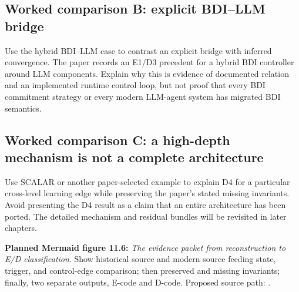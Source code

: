 \subsection{Worked comparison B: explicit BDI--LLM bridge}
Use the hybrid BDI--LLM case to contrast an explicit bridge with inferred convergence. The paper records an E1/D3 precedent for a hybrid BDI controller around LLM components. Explain why this is evidence of documented relation and an implemented runtime control loop, but not proof that every BDI commitment strategy or every modern LLM-agent system has migrated BDI semantics.

\subsection{Worked comparison C: a high-depth mechanism is not a complete architecture}
Use SCALAR or another paper-selected example to explain D4 for a particular cross-level learning edge while preserving the paper's stated missing invariants. Avoid presenting the D4 result as a claim that an entire architecture has been ported. The detailed mechanism and residual bundles will be revisited in later chapters.

\textbf{Planned Mermaid figure 11.6:} \emph{The evidence packet from reconstruction to E/D classification}. Show historical source and modern source feeding state, trigger, and control-edge comparison; then preserved and missing invariants; finally, two separate outputs, E-code and D-code. Proposed source path: .

